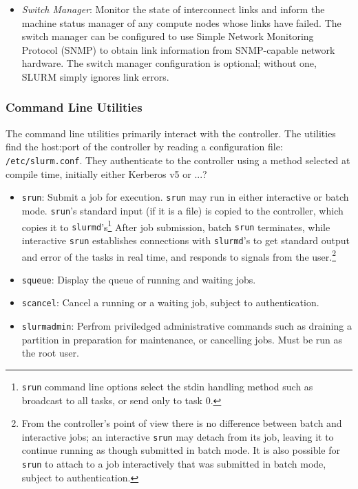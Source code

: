\begin{itemize}
\item {\em Switch Manager}:  Monitor the state of interconnect links 
and inform the machine status manager of any compute nodes whose links
have failed.  The switch manager can be configured
to use Simple Network Monitoring Protocol (SNMP) to obtain link
information from SNMP-capable network hardware.
The switch manager configuration is optional;  without one, 
SLURM simply ignores link errors.

\end{itemize}

\subsubsection{Command Line Utilities}

The command line utilities primarily interact with the controller.
The utilities find the host:port of the controller by reading a configuration 
file: {\tt /etc/slurm.conf}.
They authenticate to the controller using a method selected at compile
time, initially either Kerberos v5 or ...?


\begin{itemize}
\item {\tt srun}: Submit a job for execution.  {\tt srun} may run in either
interactive or batch mode.  {\tt srun}'s standard input (if it is a file) is 
copied to the controller, which copies it to {\tt slurmd}'s\footnote{{\tt srun}
command line options select the stdin handling method such as broadcast to 
all tasks, or send only to task 0.}
After job submission, batch {\tt srun} terminates, while interactive 
{\tt srun} establishes connections with {\tt slurmd}'s to get standard output 
and error of the tasks in real time, and responds to signals from the 
user.\footnote{From the controller's point of view there is no difference 
between batch and interactive jobs;  an interactive {\tt srun} may detach from 
its job, leaving it to continue running as though submitted in batch mode.
It is also possible for {\tt srun} to attach to a job interactively that
was submitted in batch mode, subject to authentication.}

\item {\tt squeue}: Display the queue of running and waiting jobs.

\item {\tt scancel}: Cancel a running or a waiting job, subject to
authentication.

\item {\tt slurmadmin}: Perfrom priviledged administrative commands
such as draining a partition in preparation for maintenance, or cancelling
jobs.  Must be run as the root user.

\end{itemize}

